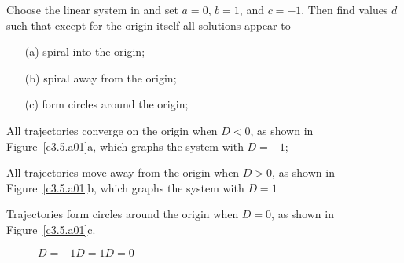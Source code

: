 \documentclass{ximera}
\begin{document}
\begin{computerExercise} \label{c3.5.a01}
Choose the {\sf linear system} in {\pplane} and set $a=0$, $b=1$, and 
$c=-1$.  Then find values $d$ such that except for the origin itself all 
solutions appear to
\begin{itemize}
\item[(a)] spiral into the origin;
\item[(b)] spiral away from the origin;
\item[(c)] form circles around the origin;
\end{itemize}

\begin{solution}

\soln
\begin{enumeratea}
\item All trajectories converge on the origin when $D < 0$, as shown in
Figure~\ref{c3.5.a01}a, which graphs the system with $D =- 1$;

\item All trajectories move away from the origin when $D > 0$, as shown in
Figure~\ref{c3.5.a01}b, which graphs the system with $D = 1$

\item Trajectories form circles around the origin when $D = 0$, as shown in
Figure~\ref{c3.5.a01}c.
\begin{figure}[htb]
                       \centerline{%
                       }
	\centerline{$D = -1$\hspace{1.4in}$D = 1$\hspace{1.4in}$D = 0$}
\end{figure}
\end{enumeratea}
\end{solution}
\end{computerExercise}
\end{document}
